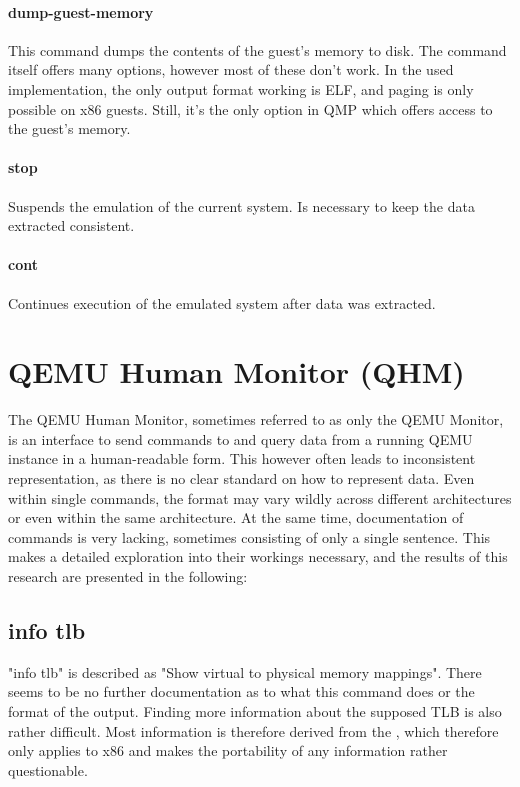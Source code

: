 \paragraph{dump-guest-memory}\label{dump_memory}
This command dumps the contents of the guest's memory to disk.
The command itself offers many options, however most of these don't work.
In the used implementation, the only output format working is ELF, and paging is only possible on x86 guests.
Still, it's the only option in QMP which offers access to the guest's memory.

\paragraph{stop}
Suspends the emulation of the current system. Is necessary to keep the data extracted consistent.

\paragraph{cont}
Continues execution of the emulated system after data was extracted.

\section{QEMU Human Monitor (QHM)} \label{sec:QHM}
The QEMU Human Monitor, sometimes referred to as only the QEMU Monitor,
is an interface to send commands to and query data from a running QEMU instance in a human-readable form.
This however often leads to inconsistent representation, as there is no clear standard on how to represent data.
Even within single commands, the format may vary wildly across different architectures or even within the same architecture.
At the same time, documentation of commands is very lacking, sometimes consisting of only a single sentence.
This makes a detailed exploration into their workings necessary, and the results of this research are presented in the following\cite{qhm-documentation}:

\subsection{info tlb}
"info tlb" is described as "Show virtual to physical memory mappings"\cite{qhm-documentation}.
There seems to be no further documentation as to what this command does or the format of the output.
Finding more information about the supposed TLB is also rather difficult.
Most information is therefore derived from the ,
which therefore only applies to x86 and makes the portability of any information rather questionable.

